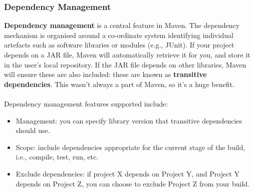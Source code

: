 \documentclass[a4paper,11pt]{article}
\begin{document}
\subsubsection{Dependency Management}
\textbf{Dependency management} is a central feature in Maven.
The dependency mechanism is organised around a co-ordinate system identifying individual artefacts such as software 
libraries or modules (e.g., JUnit).
If your project depends on a JAR file, Maven will automatically retrieve it for you, and store it in the user's local
repository.
If the JAR file depends on other libraries, Maven will ensure these are also included: these are known as 
\textbf{transitive dependencies}.
This wasn't always a part of Maven, so it's a huge benefit.
\\\\
Dependency management features supported include:
\begin{itemize}
    \item   Management: you can specify library version that transitive dependencies should use.
    \item   Scope: include dependencies appropriate for the current stage of the build, i.e., compile, test, run, etc.
    \item   Exclude dependencies: if project X depends on Project Y, and Project Y depends on Project Z, you can choose
            to exclude Project Z from your build.
\end{itemize}
\end{document}
